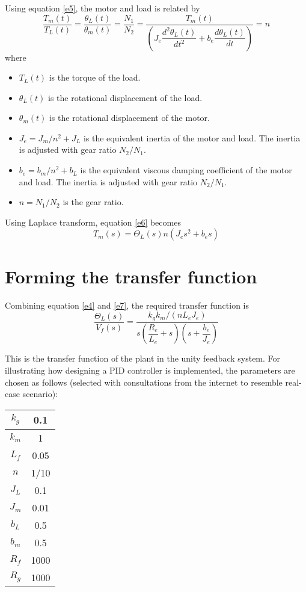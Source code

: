Using equation \ref{e5}, the motor and load is related by
\begin{equation}\label{e6}
	\dfrac{T_m(t)}{T_L(t)} = \dfrac{\theta_L(t)}{\theta_m(t)} = \dfrac{N_1}{N_2} = \dfrac{T_m(t)}{\left(J_e\dfrac{d^2\theta_L(t)}{dt^2} + b_e\dfrac{d\theta_L(t)}{dt}\right)} = n
\end{equation}
where
\begin{itemize}
	\item $ T_L(t) $ is the torque of the load.
	\item $ \theta_L(t) $ is the rotational displacement of the load.
	\item $ \theta_m(t) $ is the rotational displacement of the motor.
	\item $ J_e = J_m/n^2+J_L $ is the equivalent inertia of the motor and load. The inertia is adjusted with gear ratio $ N_2/N_1 $.
	\item $ b_e = b_m/n^2+b_L $ is the equivalent viscous damping coefficient of the motor and load. The inertia is adjusted with gear ratio $ N_2/N_1 $.
	\item $ n = N_1/N_2 $ is the gear ratio.
\end{itemize}

Using Laplace transform, equation \ref{e6} becomes
\begin{equation}\label{e7}
T_m(s) = \Theta_L(s) n\left(J_es^2 + b_es\right)
\end{equation}

\section{Forming the transfer function}
Combining equation \ref{e4} and \ref{e7}, the required transfer function is
\begin{equation}\label{e8}
	\dfrac{\Theta_L(s)}{V_f(s)} = \dfrac{k_gk_m/(nL_eJ_e)}{s(\dfrac{R_e}{L_e} + s)(s + \dfrac{b_e}{J_e})}
\end{equation}

This is the transfer function of the plant in the unity feedback system. For illustrating how designing a PID controller is implemented,  the parameters are chosen as follows (selected with consultations from the internet to resemble real-case scenario):
\begin{table}[ht]
	\centering
	\begin{tabular}{|c|c|}\hline
		$ k_g $ & 0.1\\\hline
		$ k_m $ & 1\\\hline
		$ L_f $ & 0.05\\\hline
		$ n $ & 1/10\\\hline
		$ J_L $ & 0.1\\\hline
		$ J_m $ & 0.01\\\hline
		$ b_L $ & 0.5\\\hline
		$ b_m $ & 0.5\\\hline
		$ R_f $ & 1000\\\hline
		$ R_g $ & 1000\\\hline
	\end{tabular}
\end{table}

